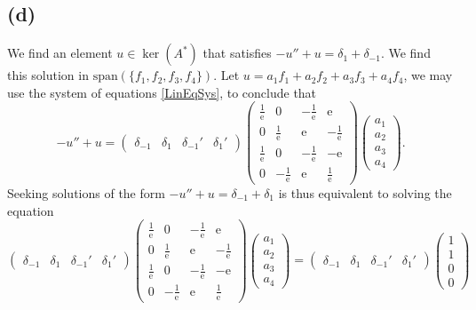 \documentclass[a4paper,11pt]{article}
\newcommand{\euler}[1]{\text{e}^{#1}}
\newcommand{\Span}[1]{\text{span}\left(#1\right)}
\numberwithin{equation}{section}
\begin{document}
\subsection*{(d)}
We find an element  $u\in\ker(A^*)$ that satisfies $ -u''+u=\delta_1+\delta_{-1} $. We find this solution in $ \Span{\{f_1,f_2,f_3,f_4\}} $. Let $ u=a_1f_1+a_2f_2+a_3f_3+a_4f_4 $, we may use the system of equations \eqref{LinEqSys}, to conclude that \begin{equation}
-u''+u=\begin{pmatrix}
\delta_{-1}&\delta_{1}&\delta_{-1}'&\delta_1'
\end{pmatrix}
\begin{pmatrix}
\frac{1}{\euler{}}&0&-\frac{1}{\euler{}}&\euler{}\\
0&\frac{1}{\euler{}}&\euler{}&-\frac{1}{\euler{}}\\
\frac{1}{\euler{}}&0&-\frac{1}{\euler{}}&-\euler{}\\
0&-\frac{1}{\euler{}}&\euler{}&\frac{1}{\euler{}}
\end{pmatrix}
\begin{pmatrix}
a_1\\a_2\\a_3\\a_4
\end{pmatrix}.
\end{equation}
Seeking solutions of the form $ -u''+u=\delta_{-1}+\delta_{1} $ is thus equivalent to solving the equation \begin{equation}
\begin{pmatrix}
\delta_{-1}&\delta_{1}&\delta_{-1}'&\delta_1'
\end{pmatrix}
\begin{pmatrix}
\frac{1}{\euler{}}&0&-\frac{1}{\euler{}}&\euler{}\\
0&\frac{1}{\euler{}}&\euler{}&-\frac{1}{\euler{}}\\
\frac{1}{\euler{}}&0&-\frac{1}{\euler{}}&-\euler{}\\
0&-\frac{1}{\euler{}}&\euler{}&\frac{1}{\euler{}}
\end{pmatrix}
\begin{pmatrix}
a_1\\a_2\\a_3\\a_4
\end{pmatrix}=\begin{pmatrix}
\delta_{-1}&\delta_{1}&\delta_{-1}'&\delta_1'
\end{pmatrix}\begin{pmatrix}
1\\1\\0\\0
\end{pmatrix}
\end{equation}
\end{document}
